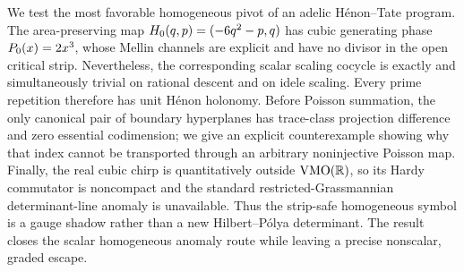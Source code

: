 We test the most favorable homogeneous pivot of an adelic H\'enon--Tate
program.  The area-preserving map
\(H_0(q,p)=(-6q^2-p,q)\) has cubic generating phase
\(P_0(x)=2x^3\), whose Mellin channels are explicit and have no divisor in
the open critical strip.  Nevertheless, the corresponding scalar scaling
cocycle is exactly and simultaneously trivial on rational descent and on
idele scaling.  Every prime repetition therefore has unit H\'enon
holonomy.  Before Poisson summation, the only canonical pair of boundary
hyperplanes has trace-class projection difference and zero essential
codimension; we give an explicit counterexample showing why that index
cannot be transported through an arbitrary noninjective Poisson map.
Finally, the real cubic chirp is quantitatively outside \(\operatorname{VMO}(\mathbb{R})\), so
its Hardy commutator is noncompact and the standard restricted-Grassmannian
determinant-line anomaly is unavailable.  Thus the strip-safe homogeneous
symbol is a gauge shadow rather than a new Hilbert--P\'olya determinant.
The result closes the scalar homogeneous anomaly route while leaving a
precise nonscalar, graded escape.
